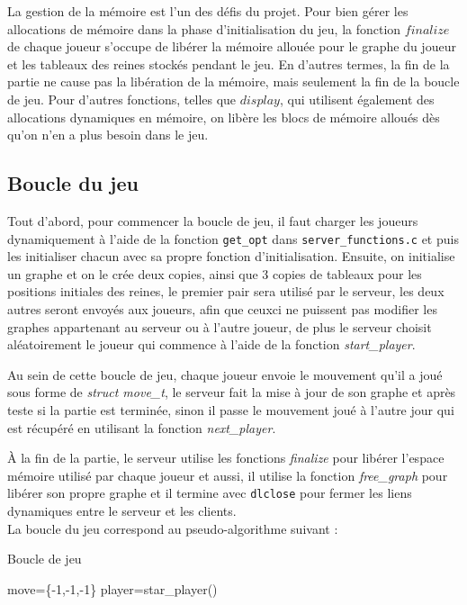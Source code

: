 \documentclass[11pt]{article}
\begin{document}
        La gestion de la mémoire est l'un des défis du projet. Pour bien gérer les allocations de mémoire dans la phase d'initialisation du jeu, la fonction $finalize$ de chaque joueur s'occupe de libérer la mémoire allouée pour le graphe du joueur et les tableaux des reines stockés pendant le jeu. En d'autres termes, la fin de la partie ne cause pas la libération de la mémoire, mais seulement la fin de la boucle de jeu. Pour d'autres fonctions, telles que $display$, qui utilisent également des allocations dynamiques en mémoire, on libère les blocs de mémoire alloués dès qu'on n'en a plus besoin dans le jeu. 
        \subsection{Boucle du jeu}
        Tout d'abord, pour commencer la boucle de jeu, il faut charger les joueurs dynamiquement à l’aide de la fonction \texttt{get\_opt} dans \texttt{server\_functions.c} et puis les initialiser chacun avec sa propre fonction d'initialisation. Ensuite, on initialise un graphe et on le crée deux copies, ainsi  que 3 copies de tableaux pour les positions initiales des reines, le premier pair sera utilisé par le serveur, les deux autres seront envoyés aux joueurs, afin que ceux\-ci ne puissent pas modifier les graphes appartenant au serveur ou à l'autre joueur, de plus le serveur choisit aléatoirement le joueur qui commence à l'aide de la fonction \textit{start\_player}.
        
        Au sein de cette boucle de jeu, chaque joueur envoie le mouvement qu'il a joué sous forme de \textit{struct move\_t}, le serveur fait la mise à jour de son graphe et après teste si la partie est terminée, sinon il passe le mouvement joué à l'autre jour qui est récupéré en utilisant la fonction \textit{next\_player}.
        
        À la fin de la partie, le serveur utilise les fonctions \textit{finalize} pour libérer l'espace mémoire utilisé par chaque joueur et aussi, il utilise la fonction \textit{free\_graph} pour libérer son propre graphe et il termine avec \texttt{dlclose} pour fermer les liens dynamiques entre le serveur et les clients.\\
        
    La boucle du jeu correspond au pseudo-algorithme suivant :
    \newpage
    \begin{algorithm}
    \caption{Boucle de jeu}
    \begin{algorithmic}
     \STATE move=\{-1,-1,-1\}
     \STATE player=star\_player()\\
    \end{algorithmic}
    \end{algorithm}
\end{document}

